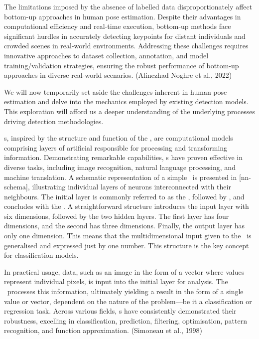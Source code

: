The limitations imposed by the absence of labelled data disproportionately affect bottom-up approaches in human pose estimation. Despite their advantages in computational efficiency and real-time execution, bottom-up methods face significant hurdles in accurately detecting keypoints for distant individuals and crowded scenes in real-world environments. Addressing these challenges requires innovative approaches to dataset collection, annotation, and model training/validation strategies, ensuring the robust performance of bottom-up approaches in diverse real-world scenarios. (\scc Alinezhad Noghre et al., 2022)

We will now temporarily set aside the challenges inherent in human pose estimation and delve into the mechanics employed by existing detection models. This exploration will afford us a deeper understanding of the underlying processes driving detection methodologies.

\NN\-s, inspired by the structure and function of the , are computational models comprising  layers of artificial  respon\-sible for processing and transforming information. Demonstrating remarkable capabilities, \NN\-s have proven effective in diverse tasks, including image recognition, natural language processing, and machine translation. A schematic representation of a simple \NN\ is presented in [nn-schema], illustrating individual layers of neurons interconnected with their neighbours. The initial layer is commonly referred to as the , followed by , and concludes with the . A straightforward structure introduces the input layer with six dimensions, followed by the two hidden layers. The first layer has four dimensions, and the second has three dimensions. Finally, the output layer has only one dimension. This means that the multidimensional input given to the \NN\ is generalised and expressed just by one number. This structure is the key concept for classification models.

In practical usage, data, such as an image in the form of a vector where values represent individual pixels, is input into the initial layer for analysis. The \NN\ processes this information, ultimately yielding a result in the form of a single value or vector, dependent on the nature of the problem—be it a classification or regression task. Across various fields, \NN\-s have consistently demonstrated their robustness, excelling in classification, prediction, filtering, optimisation, pattern recognition, and function approximation. (\scc Simoneau et al., 1998)


